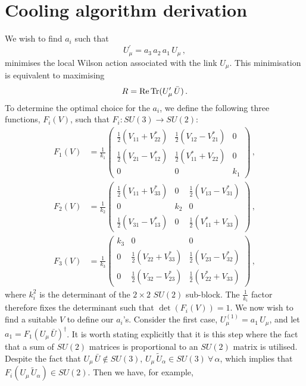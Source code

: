 \section{Cooling algorithm derivation}\label{app:Cooling}
We wish to find $a_i$ such that 
%
\begin{equation}
U_\mu^\prime = a_3 \, a_2 \, a_1 \, U_\mu\, ,
\label{eq:UPrime(app)}
\end{equation}
%
minimises the local Wilson action associated with the link $U_\mu$. This minimisation is equivalent to maximising
%
\begin{equation}
R = \operatorname{Re} \operatorname{Tr} (U_\mu^\prime \, \bar{U})\, .
\label{eq:CoolFunctional(app)}
\end{equation}
%
To determine the optimal choice for the $a_i$, we define the following three functions, $F_i(V)$, such that $F_i : SU(3)\rightarrow SU(2)$:
%
\begin{align}
F_1(V) &=\frac{1}{k_1} \begin{pmatrix}
\frac{1}{2}\left(V_{11} + V_{22}^*\right) & \frac{1}{2}\left(V_{12} - V_{21}^*\right) & 0\\
\frac{1}{2}\left(V_{21} - V_{12}^*\right) & \frac{1}{2}\left(V_{11}^* + V_{22}\right) & 0\\
0 & 0 & k_1
\end{pmatrix}\, ,\\
F_2(V) &=\frac{1}{k_2} \begin{pmatrix}
\frac{1}{2}\left(V_{11} + V_{33}^*\right) & 0 &\frac{1}{2}\left(V_{13} - V_{31}^*\right)\\
0 & k_2 & 0\\
\frac{1}{2}\left(V_{31} - V_{13}^*\right) & 0 & \frac{1}{2}\left(V_{11}^* + V_{33}\right)
\end{pmatrix}\, ,\\
F_3(V) &=\frac{1}{k_3} \begin{pmatrix}
k_3 & 0 & 0\\
0 & \frac{1}{2}\left(V_{22} + V_{33}^*\right) & \frac{1}{2}\left(V_{23} - V_{32}^*\right)\\
0 & \frac{1}{2}\left(V_{32} - V_{23}^*\right) & \frac{1}{2}\left(V_{22}^* + V_{33}\right)
\end{pmatrix}\, ,
\end{align}
%
where $k_i^2$ is the determinant of the $2\times 2$ $SU(2)$ sub-block. The $\frac{1}{k_i}$ factor therefore fixes the determinant such that $\det(F_i(V))=1$. We now wish to find a suitable $V$ to define our $a_i$'s. Consider the first case, $U^{(1)}_\mu = a_1\,U_\mu$, and let $a_1 = F_1(U_\mu\,\bar{U})^\dagger$. It is worth stating explicitly that it is this step where the fact that a sum of $SU(2)$ matrices is proportional to an $SU(2)$ matrix is utilised. Despite the fact that $U_\mu\,\bar{U} \notin SU(3)$, $U_\mu \, \tilde{U}_\alpha\in SU(3)~\forall\, \alpha$, which implies that $F_i(U_\mu\, \tilde{U}_\alpha)\in SU(2)$. Then we have, for example,
